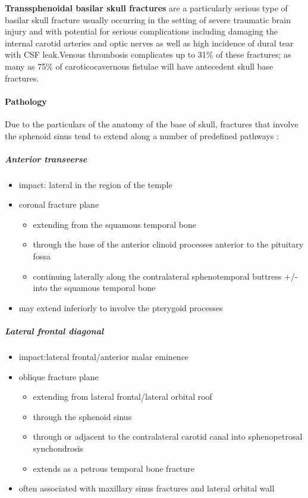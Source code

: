 \textbf{Transsphenoidal basilar skull fractures} are a particularly serious type of basilar skull fracture usually occurring in the setting of severe traumatic brain injury and with potential for serious complications including damaging the internal carotid arteries and optic nerves as well as high incidence of dural tear with CSF leak.Venous thrombosis complicates up to 31\% of these fractures; as many as 75\% of caroticocavernous fistulae will have antecedent skull base fractures.

\paragraph{Pathology}

Due to the particulars of the anatomy of the base of skull, fractures that involve the sphenoid sinus tend to extend along a number of predefined pathways :
\subparagraph{Anterior transverse}

\begin{itemize}
	\item
	impact: lateral in the region of the temple
	\item
	coronal fracture plane
	
	\begin{itemize}
		\item
		extending from the squamous temporal bone
		\item
		through the base of the anterior clinoid processes anterior to the pituitary fossa
		\item
		continuing laterally along the contralateral sphenotemporal buttress +/- into the squamous temporal bone
	\end{itemize}
	\item
	may extend inferiorly to involve the pterygoid processes
\end{itemize}

\subparagraph{Lateral frontal diagonal}

\begin{itemize}
	\item
	impact:lateral frontal/anterior malar eminence
	\item
	oblique fracture plane
	
	\begin{itemize}
		\item
		extending from lateral frontal/lateral orbital roof
		\item
		through the sphenoid sinus
		\item
		through or adjacent to the contralateral carotid canal into sphenopetrosal synchondrosis
		\item
		extends as a petrous temporal bone fracture
	\end{itemize}
	\item
	often associated with maxillary sinus fractures and lateral orbital wall
\end{itemize}


